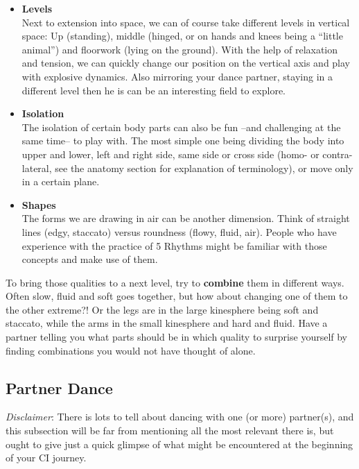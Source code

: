 \begin{itemize}
    \item [] \textbf{Levels} \\
    Next to extension into space, we can of course take different levels in vertical space: Up (standing), middle (hinged, or on hands and knees being a ``little animal'') and floorwork (lying on the ground).
    With the help of relaxation and tension, we can quickly change our position on the vertical axis and play with explosive dynamics.
    Also mirroring your dance partner, staying in a different level then he is can be an interesting field to explore.

    \item [] \textbf{Isolation} \\
    The isolation of certain body parts can also be fun --and challenging at the same time-- to play with.
    The most simple one being dividing the body into upper and lower, left and right side, same side or cross side (homo- or contra-lateral, see the anatomy section for explanation of terminology), or move only in a certain plane.

    \item [] \textbf{Shapes} \\
    The forms we are drawing in air can be another dimension.
    Think of straight lines (edgy, staccato) versus roundness (flowy, fluid, air).
    People who have experience with the practice of 5 Rhythms might be familiar with those concepts and make use of them.
\end{itemize}

To bring those qualities to a next level, try to \textbf{combine} them in different ways.
Often slow, fluid and soft goes together, but how about changing one of them to the other extreme?!
Or the legs are in the large kinesphere being soft and staccato, while the arms in the small kinesphere and hard and fluid.
Have a partner telling you what parts should be in which quality to surprise yourself by finding combinations you would not have thought of alone.

\subsection{Partner Dance}\label{subsec:partner-dance}

\textit{Disclaimer}: There is lots to tell about dancing with one (or more) partner(s), and this subsection will be far from mentioning all the most relevant there is, but ought to give just a quick glimpse of what might be encountered at the beginning of your CI journey.

